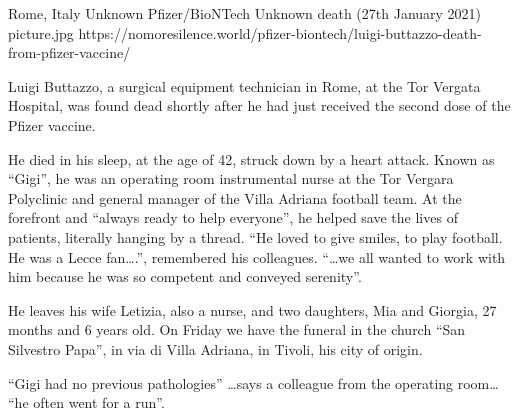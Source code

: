 {Rome, Italy}
{Unknown}
{Pfizer/BioNTech}
{Unknown}
{death (27th January 2021)}
{picture.jpg}
{https://nomoresilence.world/pfizer-biontech/luigi-buttazzo-death-from-pfizer-vaccine/}
{

Luigi Buttazzo, a surgical equipment technician in Rome, at the Tor Vergata
Hospital, was found dead shortly after he had just received the second dose of
the Pfizer vaccine.

He died in his sleep, at the age of 42, struck down by a heart attack. Known as
“Gigi”, he was an operating room instrumental nurse at the Tor Vergara
Polyclinic and general manager of the Villa Adriana football team. At the
forefront and “always ready to help everyone”, he helped save the lives of
patients, literally hanging by a thread. “He loved to give smiles, to play
football. He was a Lecce fan….”, remembered his colleagues. “…we all wanted to
work with him because he was so competent and conveyed serenity”.

He leaves his wife Letizia, also a nurse, and two daughters, Mia and Giorgia, 27
months and 6 years old. On Friday we have the funeral in the church “San
Silvestro Papa”, in via di Villa Adriana, in Tivoli, his city of origin.

“Gigi had no previous pathologies” …says a colleague from the operating room…
“he often went for a run”.

}
